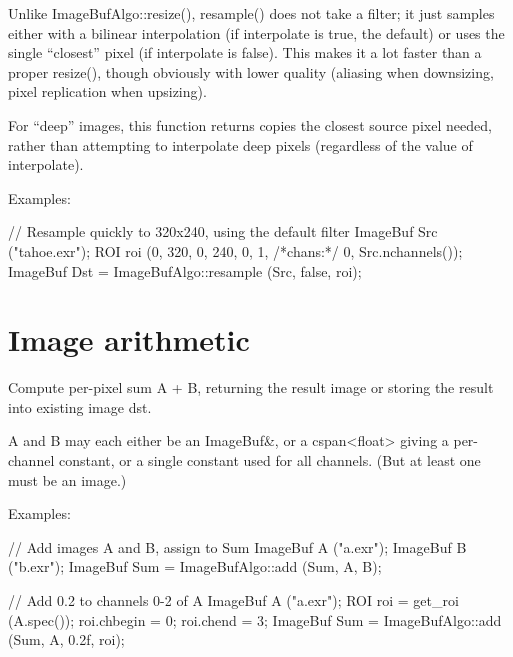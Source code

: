 Unlike {\cf ImageBufAlgo::resize()}, {\cf resample()} does not take a filter; it
just samples either with a bilinear interpolation (if {\cf interpolate} is
{\cf true}, the default) or uses the single ``closest'' pixel (if
{\cf interpolate} is {\cf false}).  This makes it a lot faster than a proper
{\cf resize()}, though obviously with lower quality (aliasing when
downsizing, pixel replication when upsizing).

For ``deep'' images, this function returns copies the closest source pixel
needed, rather than attempting to interpolate deep pixels (regardless of the
value of {\cf interpolate}).

\smallskip
\noindent Examples:
\begin{code}
    // Resample quickly to 320x240, using the default filter
    ImageBuf Src ("tahoe.exr");
    ROI roi (0, 320, 0, 240, 0, 1, /*chans:*/ 0, Src.nchannels());
    ImageBuf Dst = ImageBufAlgo::resample (Src, false, roi);
\end{code}
\apiend



\section{Image arithmetic}
\label{sec:iba:arith}

 

Compute per-pixel sum {\cf A + B}, returning the result image or storing
the result into existing image {\cf dst}.

{\cf A} and {\cf B} may each either be an {\cf ImageBuf\&}, or a
{\cf cspan<float>} giving a per-channel constant, or a single constant used
for all channels. (But at least one must be an image.)

\smallskip
\noindent Examples:
\begin{code}
    // Add images A and B, assign to Sum
    ImageBuf A ("a.exr");
    ImageBuf B ("b.exr");
    ImageBuf Sum = ImageBufAlgo::add (Sum, A, B);

    // Add 0.2 to channels 0-2 of A
    ImageBuf A ("a.exr");
    ROI roi = get_roi (A.spec());
    roi.chbegin = 0;  roi.chend = 3;
    ImageBuf Sum = ImageBufAlgo::add (Sum, A, 0.2f, roi);
\end{code}
\apiend



